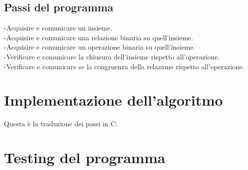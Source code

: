 ﻿\documentclass[11pt, a4paper, titlepage, block]{article}
\begin{document}
	\subsection{Passi del programma}
	-Acquisire e comunicare un insieme.\\
	-Acquisire e comunicare una relazione binaria su quell'insieme.\\
	-Acquisire e comunicare un operazione binaria su quell'insieme.\\
	-Verificare e comunicare la chiusura dell'insieme rispetto all'operazione.\\
	-Verificare e comunicare se la congruenza della relazione rispetto all'operazione.\\
	\newpage
	\section{Implementazione dell'algoritmo}
	Questa è la traduzione dei passi in C:
	

	
	
\section {Testing del programma}
\end{document}
